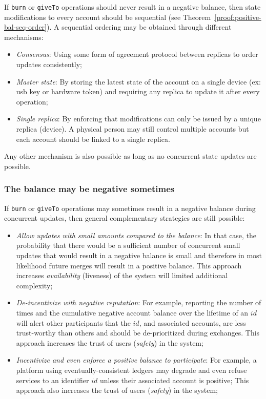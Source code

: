 \documentclass[9pt, oneside]{article}   	%
\begin{document}
If \texttt{burn} or \texttt{giveTo} operations should never result in a negative balance, then state modifications to every account should be sequential (see Theorem~\ref{proof:positive-bal-seq-order}). A sequential ordering may be obtained through different mechanisms:
\begin{itemize}
    \item \textit{Consensus}: Using some form of agreement protocol between replicas to order updates consistently;
    \item \textit{Master state}: By storing the latest state of the account on a single device (ex: usb key or hardware token) and requiring any replica to update it after every operation;
    \item \textit{Single replica}: By enforcing that modifications can only be issued by a unique replica (device). A physical person may still control multiple accounts but each account should be linked to a single replica.
\end{itemize}

Any other mechanism is also possible as long as no concurrent state updates are possible.

\subsubsection{The balance may be negative sometimes}

If \texttt{burn} or \texttt{giveTo} operations may sometimes result in a negative balance during concurrent updates, then general complementary strategies are still possible:
\begin{itemize}
	\item \textit{Allow updates with small amounts compared to the balance}: In that case, the probability that there would be a sufficient number of concurrent small updates that would result in a negative balance is small and therefore in most likelihood future merges will result in a positive balance. This approach increases \textit{availability} (liveness) of the system will limited additional complexity;
	\item \textit{De-incentivize with negative reputation}: For example, reporting the number of times and the cumulative negative account balance over the lifetime of an $id$ will alert other participants that the $id$, and associated accounts, are less trust-worthy than others and should be de-prioritized during exchanges. This approach increases the trust of users (\textit{safety}) in the system;
	\item \textit{Incentivize and even enforce a positive balance to participate}: For example, a platform using eventually-consistent ledgers may degrade and even refuse services to an identifier $id$ unless their associated account is positive;  This approach also increases the trust of users (\textit{safety}) in the system;
\end{itemize}
\end{document}
